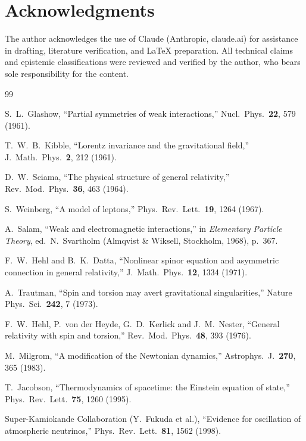 \documentclass[11pt]{article}
\theoremstyle{definition}
\begin{document}
\section*{Acknowledgments}
The author acknowledges the use of Claude (Anthropic, claude.ai) for
assistance in drafting, literature verification, and \LaTeX{} preparation.
All technical claims and epistemic classifications were reviewed and
verified by the author, who bears sole responsibility for the content.

\begin{thebibliography}{99}\small

S.~L.~Glashow, ``Partial symmetries of weak interactions,''
Nucl.\ Phys.\ \textbf{22}, 579 (1961).

T.~W.~B.~Kibble, ``Lorentz invariance and the gravitational field,''
J.\ Math.\ Phys.\ \textbf{2}, 212 (1961).

D.~W.~Sciama, ``The physical structure of general relativity,''
Rev.\ Mod.\ Phys.\ \textbf{36}, 463 (1964).

S.~Weinberg, ``A model of leptons,''
Phys.\ Rev.\ Lett.\ \textbf{19}, 1264 (1967).

A.~Salam, ``Weak and electromagnetic interactions,'' in
\emph{Elementary Particle Theory}, ed.\ N.~Svartholm
(Almqvist \& Wiksell, Stockholm, 1968), p.~367.

F.~W.~Hehl and B.~K.~Datta, ``Nonlinear spinor equation and asymmetric
connection in general relativity,''
J.\ Math.\ Phys.\ \textbf{12}, 1334 (1971).

A.~Trautman, ``Spin and torsion may avert gravitational singularities,''
Nature Phys.\ Sci.\ \textbf{242}, 7 (1973).

F.~W.~Hehl, P.~von der Heyde, G.~D.~Kerlick and J.~M.~Nester, ``General
relativity with spin and torsion,''
Rev.\ Mod.\ Phys.\ \textbf{48}, 393 (1976).

M.~Milgrom, ``A modification of the Newtonian dynamics,''
Astrophys.\ J.\ \textbf{270}, 365 (1983).

T.~Jacobson, ``Thermodynamics of spacetime: the Einstein equation of
state,'' Phys.\ Rev.\ Lett.\ \textbf{75}, 1260 (1995).

Super-Kamiokande Collaboration (Y.~Fukuda et al.), ``Evidence for
oscillation of atmospheric neutrinos,''
Phys.\ Rev.\ Lett.\ \textbf{81}, 1562 (1998).


\end{thebibliography}
\end{document}
